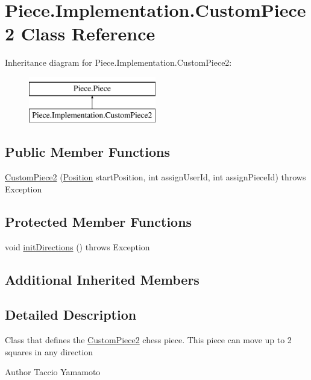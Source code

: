 \hypertarget{classPiece_1_1Implementation_1_1CustomPiece2}{\section{Piece.\-Implementation.\-Custom\-Piece2 Class Reference}
\label{classPiece_1_1Implementation_1_1CustomPiece2}
}
Inheritance diagram for Piece.\-Implementation.\-Custom\-Piece2\-:\begin{figure}[H]
\begin{center}
\leavevmode
\includegraphics[height=2.000000cm]{classPiece_1_1Implementation_1_1CustomPiece2}
\end{center}
\end{figure}
\subsection*{Public Member Functions}
\begin{DoxyCompactItemize}
\item 
\hyperlink{classPiece_1_1Implementation_1_1CustomPiece2_a749428618cabbb98dbe08d465abf25d5}{Custom\-Piece2} (\hyperlink{classUtil_1_1Position}{Position} start\-Position, int assign\-User\-Id, int assign\-Piece\-Id)  throws Exception
\end{DoxyCompactItemize}
\subsection*{Protected Member Functions}
\begin{DoxyCompactItemize}
\item 
void \hyperlink{classPiece_1_1Implementation_1_1CustomPiece2_a33801c7e929e4ab100dd23c053c98dba}{init\-Directions} ()  throws Exception 
\end{DoxyCompactItemize}
\subsection*{Additional Inherited Members}


\subsection{Detailed Description}
Class that defines the \hyperlink{classPiece_1_1Implementation_1_1CustomPiece2}{Custom\-Piece2} chess piece. This piece can move up to 2 squares in any direction \begin{DoxyAuthor}{Author}
Taccio Yamamoto 
\end{DoxyAuthor}


